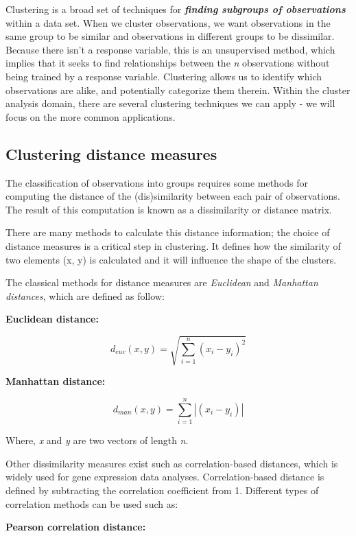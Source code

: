 \documentclass[]{book}
\theoremstyle{definition}
\theoremstyle{definition}
\theoremstyle{definition}
\theoremstyle{remark}
\begin{document}
Clustering is a broad set of techniques for \textbf{\emph{finding
subgroups of observations}} within a data set. When we cluster
observations, we want observations in the same group to be similar and
observations in different groups to be dissimilar. Because there isn't a
response variable, this is an unsupervised method, which implies that it
seeks to find relationships between the \emph{n} observations without
being trained by a response variable. Clustering allows us to identify
which observations are alike, and potentially categorize them therein.
Within the cluster analysis domain, there are several clustering
techniques we can apply - we will focus on the more common applications.

\hypertarget{clustering-distance-measures}{%
\subsection{Clustering distance
measures}\label{clustering-distance-measures}}

The classification of observations into groups requires some methods for
computing the distance of the (dis)similarity between each pair of
observations. The result of this computation is known as a dissimilarity
or distance matrix.

There are many methods to calculate this distance information; the
choice of distance measures is a critical step in clustering. It defines
how the similarity of two elements (x, y) is calculated and it will
influence the shape of the clusters.

The classical methods for distance measures are \emph{Euclidean} and
\emph{Manhattan distances}, which are defined as follow:

\textbf{Euclidean distance:}

\[ d_{euc}(x,y) = \sqrt{\sum^n_{i=1}(x_i - y_i)^2} \tag{1}\]

\textbf{Manhattan distance:}

\[ d_{man}(x,y) = \sum^n_{i=1}|(x_i - y_i)| \tag{2}\]

Where, \emph{x} and \emph{y} are two vectors of length \emph{n}.

Other dissimilarity measures exist such as correlation-based distances,
which is widely used for gene expression data analyses.
Correlation-based distance is defined by subtracting the correlation
coefficient from 1. Different types of correlation methods can be used
such as:

\textbf{Pearson correlation distance:}
\end{document}
